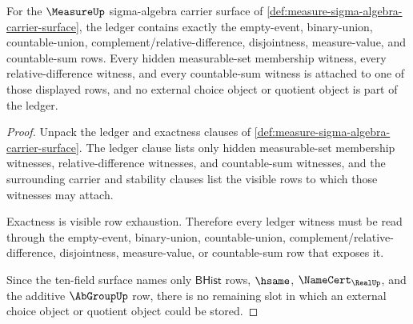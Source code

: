 \begin{theorem}
\label{thm:measure-ledger-exactness-obligation}
For the $\MeasureUp$ sigma-algebra carrier surface of
\autoref{def:measure-sigma-algebra-carrier-surface}, the ledger contains
exactly the empty-event, binary-union, countable-union,
complement/relative-difference, disjointness, measure-value, and countable-sum
rows. Every hidden measurable-set membership witness, every
relative-difference witness, and every countable-sum witness is attached to one
of those displayed rows, and no external choice object or quotient object is
part of the ledger.
\end{theorem}
\begin{proof}
Unpack the ledger and exactness clauses of
\autoref{def:measure-sigma-algebra-carrier-surface}. The ledger clause lists
only hidden measurable-set membership witnesses, relative-difference
witnesses, and countable-sum witnesses, and the surrounding carrier and
stability clauses list the visible rows to which those witnesses may attach.

Exactness is visible row exhaustion. Therefore every ledger witness must be
read through the empty-event, binary-union, countable-union,
complement/relative-difference, disjointness, measure-value, or countable-sum
row that exposes it.

Since the ten-field surface names only $\mathsf{BHist}$ rows, $\hsame$,
$\NameCert_{\RealUp}$, and the additive $\AbGroupUp$ row, there is no remaining
slot in which an external choice object or quotient object could be stored.
\end{proof}

